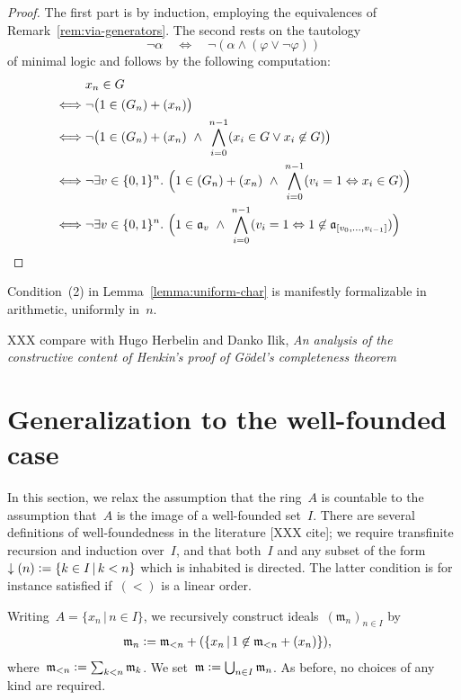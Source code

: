\documentclass[envcountsect,envcountsame,runningheads]{llncs}
\newcommand{\aaa}{\mathfrak{a}}
\newcommand{\mmm}{\mathfrak{m}}
\newcommand{\defeq}{\vcentcolon=}
\renewcommand{\_}{\mathpunct{.}\,}
\begin{document}
\begin{proof}The first part is by induction, employing the equivalences of
Remark~\ref{rem:via-generators}. The second rests on the tautology
\[ \neg\alpha \quad\Longleftrightarrow\quad \neg(\alpha \wedge (\varphi \vee \neg\varphi)) \]
of minimal logic and follows by the following computation:
\begin{align*}
  &\mathrel{\phantom{\Longleftrightarrow}} x_n \in G \\
  &\Longleftrightarrow \neg\bigl(1 \in (G_n) + (x_n)\bigr) \\
  &\Longleftrightarrow \neg\bigl(1 \in (G_n) + (x_n) \ \wedge\ \bigwedge_{i=0}^{n-1} (x_i \in G \vee x_i \not\in G)\bigr) \\
  &\Longleftrightarrow \neg\exists v \in \{0,1\}^n\_
    \Bigl(1 \in (G_n) + (x_n) \ \wedge\ \bigwedge_{i=0}^{n-1} (v_i = 1
    \Leftrightarrow x_i \in G)\Bigr) \\
  &\Longleftrightarrow \neg\exists v \in \{0,1\}^n\_
    \Bigl(1 \in \aaa_v \ \wedge\ \bigwedge_{i=0}^{n-1} (v_i = 1
    \Leftrightarrow 1 \not\in \aaa_{[v_0,\ldots,v_{i-1}]})\Bigr) %
\end{align*}
\end{proof}

Condition~(2) in Lemma~\ref{lemma:uniform-char} is manifestly formalizable in
arithmetic, uniformly in~$n$.

XXX compare with Hugo Herbelin and Danko Ilik, \emph{An analysis of the
constructive content of Henkin’s proof of
Gödel’s completeness theorem}


\section{Generalization to the well-founded case}

In this section, we relax the assumption that the ring~$A$ is countable to the
assumption that~$A$ is the image of a well-founded set~$I$. There are several
definitions of well-foundedness in the literature [XXX cite]; we require
transfinite recursion and induction over~$I$, and that both~$I$ and any subset
of the form~${\downarrow(n)} \defeq \{k \in I \,|\, k < n\}$ which is inhabited is directed. The
latter condition is for instance satisfied if~$({<})$ is a linear order.

Writing~$A = \{ x_n \,|\, n \in I \}$, we recursively construct
ideals~$(\mmm_n)_{n \in I}$ by
\begin{align*}
  \mmm_n &\defeq \mmm_{<n} + (\{ x_n \,|\, 1 \not\in \mmm_{<n} + (x_n) \}),
\end{align*}
where~$\mmm_{<n} \defeq \sum_{k < n} \mmm_k$. We set~$\mmm \defeq \bigcup_{n
\in I} \mmm_n$. As before, no choices of any kind are required.
\end{document}

